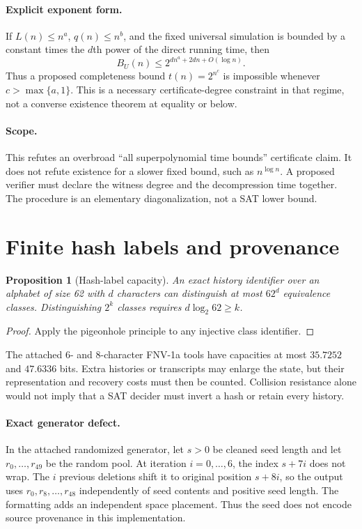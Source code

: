 \documentclass[11pt]{article}
\newtheorem{proposition}[theorem]{Proposition}
\begin{document}
\paragraph{Explicit exponent form.} If $L(n)\le n^a$, $q(n)\le n^b$, and
the fixed universal simulation is bounded by a constant times the $d$th
power of the direct running time, then
\[
 B_U(n)\le 2^{d n^a+2dn+O(\log n)}.
\]
Thus a proposed completeness bound $t(n)=2^{n^c}$ is impossible whenever
$c>\max\{a,1\}$. This is a necessary certificate-degree constraint in that
regime, not a converse existence theorem at equality or below.
\paragraph{Scope.} This refutes an overbroad ``all superpolynomial time
bounds'' certificate claim. It does not refute existence for a slower fixed
bound, such as $n^{\log n}$. A proposed verifier must declare the witness
degree and the decompression time together. The procedure is an elementary
diagonalization, not a SAT lower bound.

\section{Finite hash labels and provenance}
\begin{proposition}[Hash-label capacity]
An exact history identifier over an alphabet of size 62 with $d$ characters
can distinguish at most $62^d$ equivalence classes. Distinguishing $2^k$
classes requires $d\log_2 62\ge k$.
\end{proposition}
\begin{proof} Apply the pigeonhole principle to any injective class identifier.
\end{proof}
The attached 6- and 8-character FNV-1a tools have capacities at most
$35.7252$ and $47.6336$ bits. Extra histories or transcripts may enlarge the
state, but their representation and recovery costs must then be counted.
Collision resistance alone would not imply that a SAT decider must invert a
hash or retain every history.

\paragraph{Exact generator defect.} In the attached randomized generator,
let $s>0$ be cleaned seed length and let $r_0,\ldots,r_{49}$ be the random
pool. At iteration $i=0,\ldots,6$, the index $s+7i$ does not wrap. The $i$
previous deletions shift it to original position $s+8i$, so the output uses
$r_0,r_8,\ldots,r_{48}$ independently of seed contents and positive seed
length. The formatting adds an independent space placement. Thus the seed
does not encode source provenance in this implementation.
\end{document}
